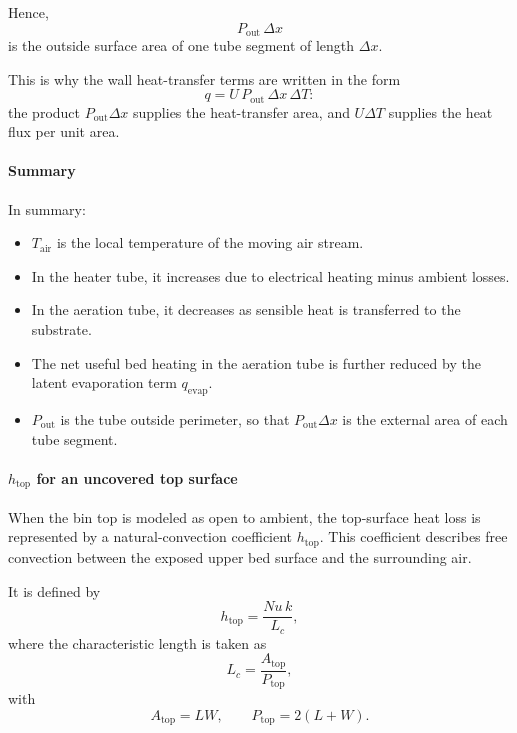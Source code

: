 \documentclass{article}
\begin{document}
Hence,
\begin{equation}
P_{\text{out}}\,\Delta x
\end{equation}
is the outside surface area of one tube segment of length $\Delta x$.

This is why the wall heat-transfer terms are written in the form
\begin{equation}
q = U\,P_{\text{out}}\,\Delta x\,\Delta T:
\end{equation}
the product $P_{\text{out}}\Delta x$ supplies the heat-transfer area, and
$U\Delta T$ supplies the heat flux per unit area.

\paragraph{Summary}

In summary:
\begin{itemize}
\item $T_{\text{air}}$ is the local temperature of the moving air stream.
\item In the heater tube, it increases due to electrical heating minus
      ambient losses.
\item In the aeration tube, it decreases as sensible heat is transferred to
      the substrate.
\item The net useful bed heating in the aeration tube is further reduced by
      the latent evaporation term $q_{\text{evap}}$.
\item $P_{\text{out}}$ is the tube outside perimeter, so that
      $P_{\text{out}}\Delta x$ is the external area of each tube segment.
\end{itemize}

\paragraph{$h_{\text{top}}$ for an uncovered top surface}

When the bin top is modeled as open to ambient, the top-surface heat loss is
represented by a natural-convection coefficient $h_{\text{top}}$. This
coefficient describes free convection between the exposed upper bed surface
and the surrounding air.

It is defined by
\begin{equation}
h_{\text{top}}=\frac{Nu\,k}{L_c},
\end{equation}
where the characteristic length is taken as
\begin{equation}
L_c=\frac{A_{\text{top}}}{P_{\text{top}}},
\end{equation}
with
\begin{equation}
A_{\text{top}} = LW,
\qquad
P_{\text{top}} = 2(L+W).
\end{equation}
\end{document}
